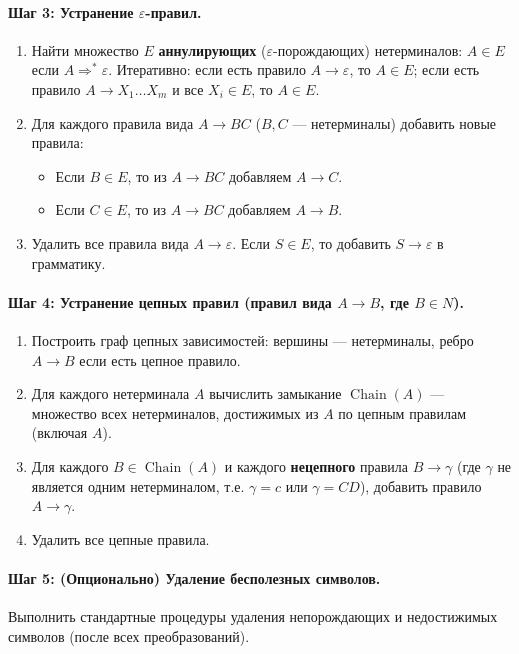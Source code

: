 \documentclass[12pt,a4paper]{article}
\theoremstyle{definition}
\begin{document}
\paragraph{Шаг 3: Устранение $\varepsilon$-правил.}
\begin{enumerate}
\item Найти множество $E$ \textbf{аннулирующих} ($\varepsilon$-порождающих) нетерминалов: $A \in E$ если $A \Rightarrow^* \varepsilon$.
   Итеративно: если есть правило $A \to \varepsilon$, то $A \in E$; если есть правило $A \to X_1\ldots X_m$ и все $X_i \in E$, то $A \in E$.
\item Для каждого правила вида $A \to BC$ ($B,C$ --- нетерминалы) добавить новые правила:
   \begin{itemize}
   \item Если $B \in E$, то из $A \to BC$ добавляем $A \to C$.
   \item Если $C \in E$, то из $A \to BC$ добавляем $A \to B$.
   \end{itemize}
\item Удалить все правила вида $A \to \varepsilon$. Если $S \in E$, то добавить $S \to \varepsilon$ в грамматику.
\end{enumerate}

\paragraph{Шаг 4: Устранение цепных правил (правил вида $A \to B$, где $B \in N$).}
\begin{enumerate}
\item Построить граф цепных зависимостей: вершины --- нетерминалы, ребро $A \to B$ если есть цепное правило.
\item Для каждого нетерминала $A$ вычислить замыкание $\operatorname{Chain}(A)$ --- множество всех нетерминалов, достижимых из $A$ по цепным правилам (включая $A$).
\item Для каждого $B \in \operatorname{Chain}(A)$ и каждого \textbf{нецепного} правила $B \to \gamma$ (где $\gamma$ не является одним нетерминалом, т.е. $\gamma = c$ или $\gamma = CD$), добавить правило $A \to \gamma$.
\item Удалить все цепные правила.
\end{enumerate}

\paragraph{Шаг 5: (Опционально) Удаление бесполезных символов.}
Выполнить стандартные процедуры удаления непорождающих и недостижимых символов (после всех преобразований).
\end{document}
